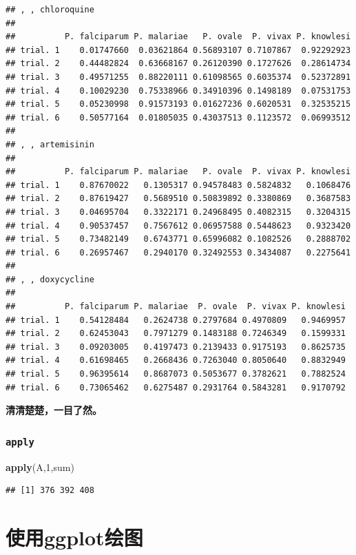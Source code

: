 \documentclass[]{book}
\newenvironment{Shaded}{\begin{snugshade}}{\end{snugshade}}
\newcommand{\DecValTok}[1]{\textcolor[rgb]{0.00,0.00,0.81}{#1}}
\newcommand{\KeywordTok}[1]{\textcolor[rgb]{0.13,0.29,0.53}{\textbf{#1}}}
\newcommand{\NormalTok}[1]{#1}
\begin{document}
\begin{verbatim}
## , , chloroquine
## 
##          P. falciparum P. malariae   P. ovale  P. vivax P. knowlesi
## trial. 1    0.01747660  0.03621864 0.56893107 0.7107867  0.92292923
## trial. 2    0.44482824  0.63668167 0.26120390 0.1727626  0.28614734
## trial. 3    0.49571255  0.88220111 0.61098565 0.6035374  0.52372891
## trial. 4    0.10029230  0.75338966 0.34910396 0.1498189  0.07531753
## trial. 5    0.05230998  0.91573193 0.01627236 0.6020531  0.32535215
## trial. 6    0.50577164  0.01805035 0.43037513 0.1123572  0.06993512
## 
## , , artemisinin
## 
##          P. falciparum P. malariae   P. ovale  P. vivax P. knowlesi
## trial. 1    0.87670022   0.1305317 0.94578483 0.5824832   0.1068476
## trial. 2    0.87619427   0.5689510 0.50839892 0.3380869   0.3687583
## trial. 3    0.04695704   0.3322171 0.24968495 0.4082315   0.3204315
## trial. 4    0.90537457   0.7567612 0.06957588 0.5448623   0.9323420
## trial. 5    0.73482149   0.6743771 0.65996082 0.1082526   0.2888702
## trial. 6    0.26957467   0.2940170 0.32492553 0.3434087   0.2275641
## 
## , , doxycycline
## 
##          P. falciparum P. malariae  P. ovale  P. vivax P. knowlesi
## trial. 1    0.54128484   0.2624738 0.2797684 0.4970809   0.9469957
## trial. 2    0.62453043   0.7971279 0.1483188 0.7246349   0.1599331
## trial. 3    0.09203005   0.4197473 0.2139433 0.9175193   0.8625735
## trial. 4    0.61698465   0.2668436 0.7263040 0.8050640   0.8832949
## trial. 5    0.96395614   0.8687073 0.5053677 0.3782621   0.7882524
## trial. 6    0.73065462   0.6275487 0.2931764 0.5843281   0.9170792
\end{verbatim}

\textbf{清清楚楚，一目了然。}

\hypertarget{apply}{%
\subsection{\texorpdfstring{\texttt{apply}}{apply}}\label{apply}}

\begin{Shaded}
\begin{Highlighting}[]
\KeywordTok{apply}\NormalTok{(A,}\DecValTok{1}\NormalTok{,sum)}
\end{Highlighting}
\end{Shaded}

\begin{verbatim}
## [1] 376 392 408
\end{verbatim}

\hypertarget{graphics}{%
\chapter{使用ggplot绘图}\label{graphics}}
\end{document}
